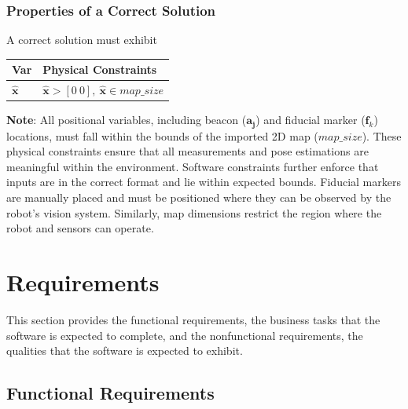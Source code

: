\documentclass[12pt]{article}
\begin{document}
\subsubsection{Properties of a Correct Solution}\label{sec_CorrectSolution}

\noindent
A correct solution must exhibit

\begin{table}[!h]
\caption{Output Variables}\label{TblOutputVar}
\renewcommand{\arraystretch}{1.2}
\noindent \begin{longtable*}{l l} 
  \toprule
  \textbf{Var} & \textbf{Physical Constraints} \\
  \midrule 
  $\mathbf{\hat{x}}$ & $\mathbf{\hat{x}} > [0~0],~\mathbf{\hat{x}} \in map\_size$
  \\
  \bottomrule
\end{longtable*}
\end{table}

\noindent \textbf{Note}: All positional variables, including beacon ($\mathbf{a_j}$) and fiducial marker ($\mathbf{f}_k$) locations, must fall within the bounds of the imported 2D map ($map\_size$). These physical constraints ensure that all measurements and pose estimations are meaningful within the environment. Software constraints further enforce that inputs are in the correct format and lie within expected bounds. Fiducial markers are manually placed and must be positioned where they can be observed by the robot's vision system. Similarly, map dimensions restrict the region where the robot and sensors can operate.

\section{Requirements}

This section provides the functional requirements, the business tasks that the
software is expected to complete, and the nonfunctional requirements, the
qualities that the software is expected to exhibit.

\subsection{Functional Requirements}
\end{document}
